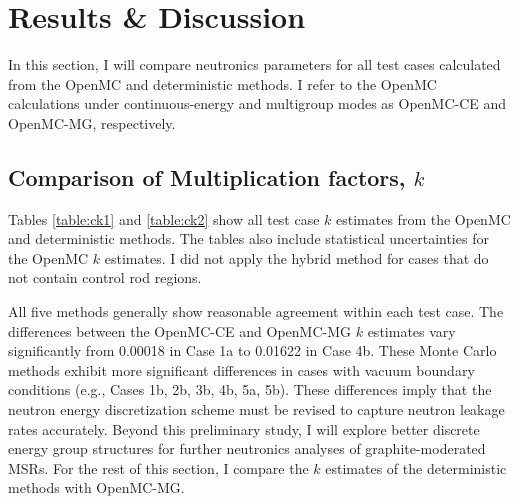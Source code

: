 \section{Results \& Discussion} \label{sec:prelim-results}

In this section, I will compare neutronics parameters for all test cases calculated from
the OpenMC and deterministic methods. I refer to the OpenMC calculations under continuous-energy
and multigroup modes as OpenMC-CE and OpenMC-MG, respectively.

\subsection{Comparison of Multiplication factors, $k$}

Tables \ref{table:ck1} and \ref{table:ck2} show all test case $k$ estimates from the OpenMC and
deterministic methods. The tables also include statistical uncertainties for the OpenMC
$k$ estimates. I did not apply the hybrid method for cases that do not contain control rod
regions. 

All five methods generally show reasonable agreement within each test case. The differences between
the OpenMC-CE and OpenMC-MG $k$ estimates vary significantly from 0.00018 in Case 1a to 0.01622 in
Case 4b. These Monte Carlo methods exhibit more significant differences in cases
with vacuum boundary conditions (e.g., Cases 1b, 2b, 3b, 4b, 5a, 5b). These differences imply that
the neutron energy discretization scheme must be revised to capture neutron leakage rates
accurately. Beyond this preliminary study, I will explore better discrete energy group structures
for further neutronics analyses of graphite-moderated \glspl{MSR}. For the rest of this
section, I compare the $k$ estimates of the deterministic methods with OpenMC-MG.

